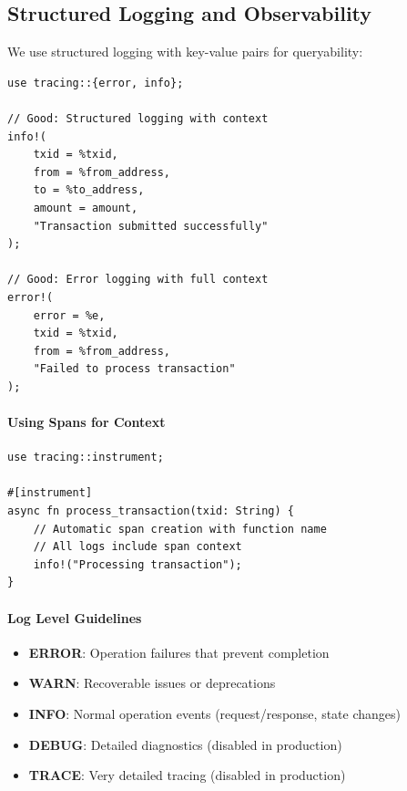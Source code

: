 \subsection{Structured Logging and Observability}

We use structured logging with key-value pairs for queryability:

\begin{listing}[htbp]
\caption{Structured logging with context}
\label{lst:structured-logging}
\begin{verbatim}
use tracing::{error, info};

// Good: Structured logging with context
info!(
    txid = %txid,
    from = %from_address,
    to = %to_address,
    amount = amount,
    "Transaction submitted successfully"
);

// Good: Error logging with full context
error!(
    error = %e,
    txid = %txid,
    from = %from_address,
    "Failed to process transaction"
);
\end{verbatim}
\end{listing}

\paragraph{Using Spans for Context}

\begin{listing}[H]
\caption{Spans for operation context}
\label{lst:spans-context}
\begin{verbatim}
use tracing::instrument;

#[instrument]
async fn process_transaction(txid: String) {
    // Automatic span creation with function name
    // All logs include span context
    info!("Processing transaction");
}
\end{verbatim}
\end{listing}

\paragraph{Log Level Guidelines}

\begin{itemize}
  \item \textbf{ERROR}: Operation failures that prevent completion
  \item \textbf{WARN}: Recoverable issues or deprecations
  \item \textbf{INFO}: Normal operation events (request/response, state changes)
  \item \textbf{DEBUG}: Detailed diagnostics (disabled in production)
  \item \textbf{TRACE}: Very detailed tracing (disabled in production)
\end{itemize}

